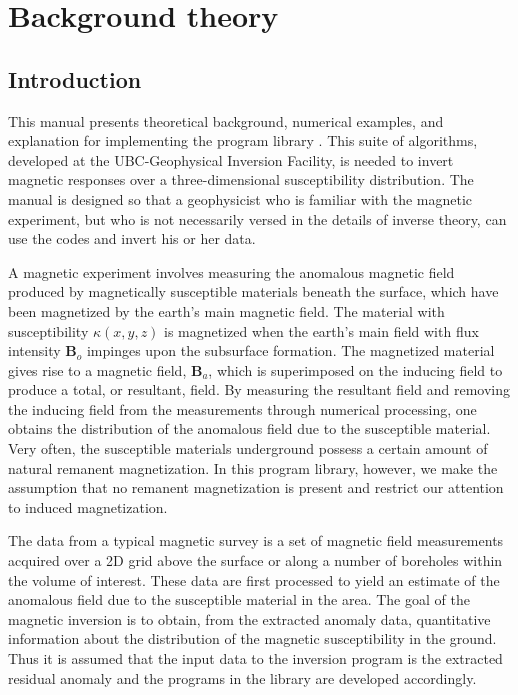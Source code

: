 \section{Background theory}

\subsection{Introduction}

This manual presents theoretical background, numerical examples, and explanation for implementing the program library \prog. This suite of algorithms, developed at the UBC-Geophysical Inversion Facility, is needed to invert magnetic responses over a three-dimensional susceptibility distribution. The manual is designed so that a geophysicist who is familiar with the magnetic experiment, but who is not necessarily versed in the details of inverse theory, can use the codes and invert his or her data.

A magnetic experiment involves measuring the anomalous magnetic field produced by magnetically susceptible materials beneath the surface, which have been magnetized by the earth's main magnetic field. The material with susceptibility $\kappa(x,y,z)$ is magnetized when the earth's main field with flux intensity $\mathbf{B}_o$ impinges upon the subsurface formation. The magnetized material gives rise to a
magnetic field, $\mathbf{B}_a$, which is superimposed on the inducing field to produce a total, or resultant, field. By measuring the resultant field and removing the inducing field from the measurements through numerical processing, one obtains the distribution of the anomalous field due to the susceptible material. Very often, the susceptible materials underground possess a certain amount of natural remanent magnetization. In this program library, however, we make the assumption that no remanent magnetization is present and restrict our attention to induced magnetization.

The data from a typical magnetic survey is a set of magnetic field measurements acquired over a 2D grid above the surface or along a number of boreholes within the volume of interest. These data are first processed to yield an estimate of the anomalous field due to the susceptible material in the area. The goal of the magnetic inversion is to obtain, from the extracted anomaly data, quantitative information about the distribution of the magnetic susceptibility in the ground. Thus it is assumed that the input data to the inversion program is the extracted residual anomaly and the programs in the library are developed accordingly.

